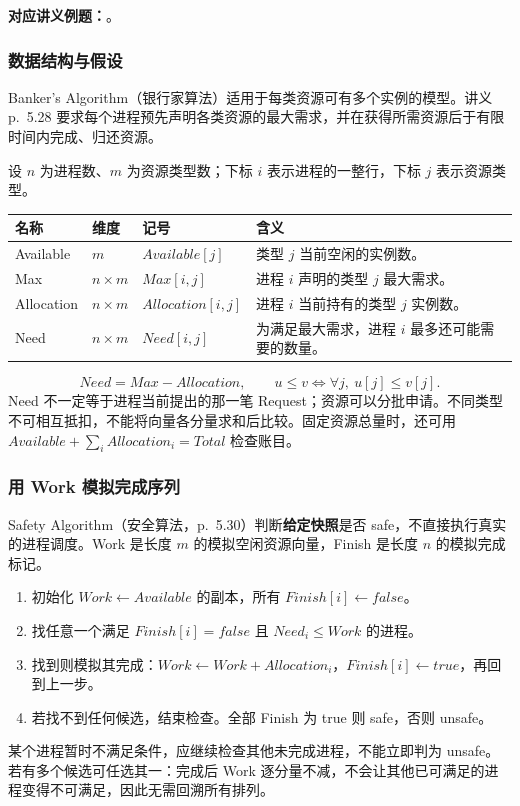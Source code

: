 \textbf{对应讲义例题：}。

\subsubsection{数据结构与假设}

Banker's Algorithm（银行家算法）适用于每类资源可有多个实例的模型。讲义 p.~5.28 要求每个进程预先声明各类资源的最大需求，并在获得所需资源后于有限时间内完成、归还资源。

设 $n$ 为进程数、$m$ 为资源类型数；下标 $i$ 表示进程的一整行，下标 $j$ 表示资源类型。
\begin{center}
\begin{tabularx}{\textwidth}{@{}lllX@{}}
  \toprule
  名称 & 维度 & 记号 & 含义 \\
  \midrule
  Available & $m$ & $Available[j]$ & 类型 $j$ 当前空闲的实例数。 \\
  Max & $n\times m$ & $Max[i,j]$ & 进程 $i$ 声明的类型 $j$ 最大需求。 \\
  Allocation & $n\times m$ & $Allocation[i,j]$ & 进程 $i$ 当前持有的类型 $j$ 实例数。 \\
  Need & $n\times m$ & $Need[i,j]$ & 为满足最大需求，进程 $i$ 最多还可能需要的数量。 \\
  \bottomrule
\end{tabularx}
\end{center}
\[
  \boxed{Need=Max-Allocation},\qquad
  u\le v\iff \forall j,\ u[j]\le v[j].
\]
Need 不一定等于进程当前提出的那一笔 Request；资源可以分批申请。不同类型不可相互抵扣，不能将向量各分量求和后比较。固定资源总量时，还可用 $Available+\sum_i Allocation_i=Total$ 检查账目。


\subsubsection{用 Work 模拟完成序列}

Safety Algorithm（安全算法，p.~5.30）判断\textbf{给定快照}是否 safe，不直接执行真实的进程调度。Work 是长度 $m$ 的模拟空闲资源向量，Finish 是长度 $n$ 的模拟完成标记。

\begin{enumerate}
  \item 初始化 $Work\leftarrow Available$ 的副本，所有 $Finish[i]\leftarrow false$。
  \item 找任意一个满足 $Finish[i]=false$ 且 $Need_i\le Work$ 的进程。
  \item 找到则模拟其完成：$Work\leftarrow Work+Allocation_i$，$Finish[i]\leftarrow true$，再回到上一步。
  \item 若找不到任何候选，结束检查。全部 Finish 为 true 则 safe，否则 unsafe。
\end{enumerate}
某个进程暂时不满足条件，应继续检查其他未完成进程，不能立即判为 unsafe。若有多个候选可任选其一：完成后 Work 逐分量不减，不会让其他已可满足的进程变得不可满足，因此无需回溯所有排列。

